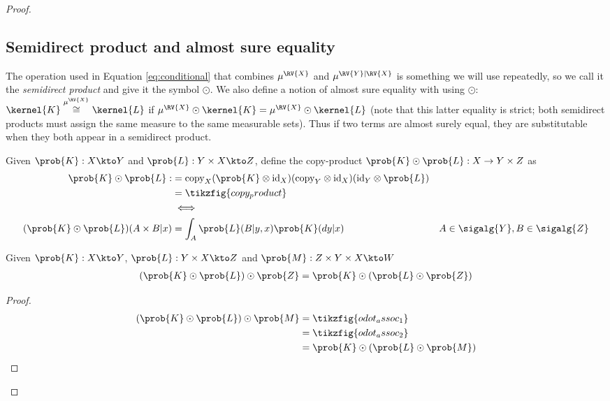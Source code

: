 \begin{proof}
\subsection{Semidirect product and almost sure equality}

The operation used in Equation \ref{eq:conditional} that combines $\mu^{\RV{X}}$ and $\mu^{\RV{Y}|\RV{X}}$ is something we will use repeatedly, so we call it the \emph{semidirect product} and give it the symbol $\odot$. We also define a notion of almost sure equality with using $\odot$: $\kernel{K}\overset{\mu^{\RV{X}}}{\cong} \kernel{L}$ if $\mu^{\RV{X}}\odot \kernel{K}=\mu^{\RV{X}}\odot\kernel{L}$ (note that this latter equality is strict; both semidirect products must assign the same measure to the same measurable sets). Thus if two terms are almost surely equal, they are substitutable when they both appear in a semidirect product.

\begin{definition}\label{def:copyproduct}
Given $\prob{K}:X\kto Y$ and $\prob{L}:Y\times X\kto Z$, define the copy-product $\prob{K}\odot\prob{L}:X\to Y\times Z$ as
\begin{align}
    \prob{K}\odot\prob{L}:&= \text{copy}_X(\prob{K}\otimes \text{id}_X)(\text{copy}_Y\otimes\text{id}_X )(\text{id}_Y \otimes \prob{L})\\
                            &= \tikzfig{copy_product}\\
                            &\iff\\
    (\prob{K}\odot\prob{L})(A\times B|x) &= \int_A \prob{L}(B|y,x)\prob{K}(dy|x)&A\in \sigalg{Y},B\in\sigalg{Z}
\end{align}
\end{definition}

\begin{lemma}
Given $\prob{K}:X\kto Y$, $\prob{L}:Y\times X\kto Z$ and $\prob{M}:Z\times Y\times X\kto W$
\begin{align}
    (\prob{K}\odot \prob{L})\odot \prob{Z} &= \prob{K}\odot(\prob{L}\odot\prob{Z})\\
\end{align}
\end{lemma}

\begin{proof}
\begin{align}
    (\prob{K}\odot \prob{L})\odot \prob{M} &= \tikzfig{odot_assoc_1}\\
                                            &=  \tikzfig{odot_assoc_2}\\
                                            &= \prob{K}\odot (\prob{L}\odot \prob{M})
\end{align}
\end{proof}


\end{proof}
